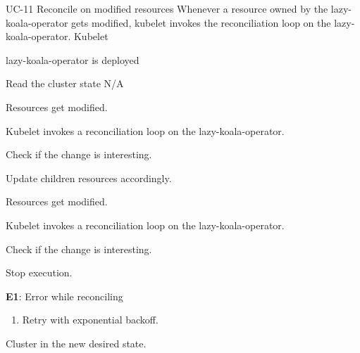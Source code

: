 \vspace{-2em}
\UseCaseDescription
{UC-11}
{Reconcile on modified resources}
{Whenever a resource owned by the \ac{lazy-koala-operator} gets modified, kubelet invokes the reconciliation loop on the \ac{lazy-koala-operator}.}
{Kubelet}
{\begin{CompactItemizes}
    \item \ac{lazy-koala-operator} is deployed
\end{CompactItemizes}}
{Read the cluster state}
{N/A}
{\begin{CompactEnumerate}
    \item Resources get modified.
    \item Kubelet invokes a reconciliation loop on the \ac{lazy-koala-operator}.
    \item Check if the change is interesting.
    \item Update children resources accordingly.
\end{CompactEnumerate}}
{{\begin{CompactEnumerate}
    \item Resources get modified.
    \item Kubelet invokes a reconciliation loop on the \ac{lazy-koala-operator}.
    \item Check if the change is interesting.
    \item Stop execution.
\end{CompactEnumerate}}
{\textbf{E1}: Error while reconciling
\vspace{-4mm}\begin{enumerate}
    \item Retry with exponential backoff.
\vspace{-7mm}\end{enumerate}}
{\begin{CompactItemizes}
    \item Cluster in the new desired state.
\end{CompactItemizes}}}